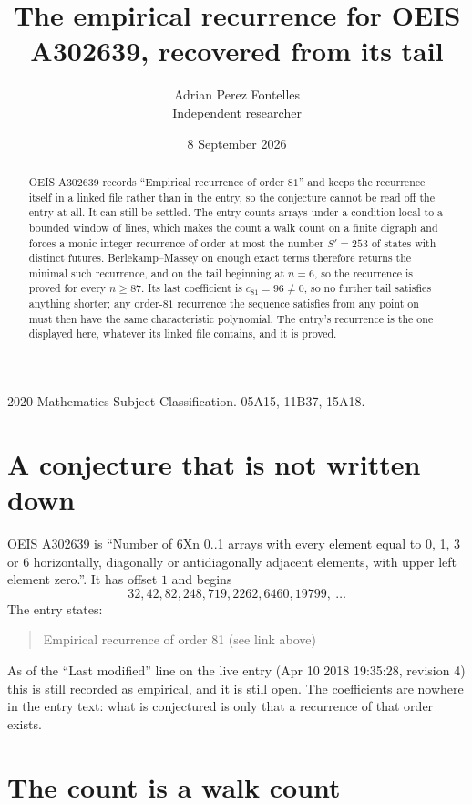 \documentclass[11pt,a4paper]{article}
\title{The empirical recurrence for OEIS A302639, recovered from its tail}
\author{Adrian Perez Fontelles\\ \small Independent researcher}
\date{8 September 2026}
\theoremstyle{plain}
\theoremstyle{definition}
\begin{document}
\maketitle

\begin{abstract}
OEIS A302639 records ``Empirical recurrence of order $81$'' and keeps the recurrence itself in
a linked file rather than in the entry, so the conjecture cannot be read off the entry at all.
It can still be settled. The entry counts arrays under a condition local to a bounded window of
lines, which makes the count a walk count on a finite digraph and forces a monic integer
recurrence of order at most the number $S'=253$ of states with distinct futures. Berlekamp--Massey on
enough exact terms therefore returns the minimal such recurrence, and on the tail beginning at $n=6$, so the recurrence is proved for every $n\ge87$.
Its last coefficient is $c_{81}=96\neq0$, so no further tail satisfies anything
shorter; any order-$81$ recurrence the sequence satisfies from any point on must then have
the same characteristic polynomial. The entry's recurrence is the one displayed here, whatever
its linked file contains, and it is proved.
\end{abstract}

\noindent\small 2020 Mathematics Subject Classification. 05A15, 11B37, 15A18.\normalsize

\section{A conjecture that is not written down}

OEIS A302639 is ``Number of 6Xn 0..1 arrays with every element equal to 0, 1, 3 or 6 horizontally, diagonally or antidiagonally adjacent elements, with upper left element zero.''. It has offset $1$ and begins
\[
32, 42, 82, 248, 719, 2262, 6460, 19799,\ \dots
\]
The entry states:
\begin{quote}
Empirical recurrence of order 81 (see link above)
\end{quote}
As of the ``Last modified'' line on the live entry (Apr 10 2018 19:35:28, revision 4)
this is still recorded as empirical, and it is still open. The coefficients are nowhere in the
entry text: what is conjectured is only that a recurrence of that order exists.

\section{The count is a walk count}
\end{document}
